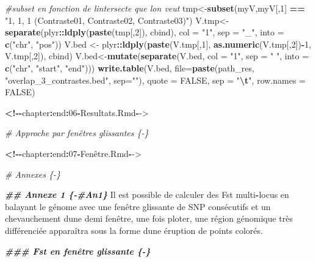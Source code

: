 \documentclass[
  openany]{book}
\newenvironment{Shaded}{\begin{snugshade}}{\end{snugshade}}
\newcommand{\AttributeTok}[1]{\textcolor[rgb]{0.13,0.29,0.53}{#1}}
\newcommand{\CommentTok}[1]{\textcolor[rgb]{0.56,0.35,0.01}{\textit{#1}}}
\newcommand{\ConstantTok}[1]{\textcolor[rgb]{0.56,0.35,0.01}{#1}}
\newcommand{\DecValTok}[1]{\textcolor[rgb]{0.00,0.00,0.81}{#1}}
\newcommand{\DocumentationTok}[1]{\textcolor[rgb]{0.56,0.35,0.01}{\textbf{\textit{#1}}}}
\newcommand{\ErrorTok}[1]{\textcolor[rgb]{0.64,0.00,0.00}{\textbf{#1}}}
\newcommand{\FunctionTok}[1]{\textcolor[rgb]{0.13,0.29,0.53}{\textbf{#1}}}
\newcommand{\NormalTok}[1]{#1}
\newcommand{\OtherTok}[1]{\textcolor[rgb]{0.56,0.35,0.01}{#1}}
\newcommand{\SpecialCharTok}[1]{\textcolor[rgb]{0.81,0.36,0.00}{\textbf{#1}}}
\newcommand{\StringTok}[1]{\textcolor[rgb]{0.31,0.60,0.02}{#1}}
\theoremstyle{definition}
\theoremstyle{definition}
\theoremstyle{definition}
\theoremstyle{definition}
\theoremstyle{remark}
\begin{document}
\begin{Shaded}
\begin{Highlighting}[]
\CommentTok{\#subset en fonction de l\textquotesingle{}intersecte que l\textquotesingle{}on veut}
\NormalTok{tmp}\OtherTok{\textless{}{-}}\FunctionTok{subset}\NormalTok{(myV,myV[,}\DecValTok{1}\NormalTok{] }\SpecialCharTok{==} \StringTok{"1, 1, 1 (Contraste01, Contraste02, Contraste03)"}\NormalTok{)}
\NormalTok{V.tmp}\OtherTok{\textless{}{-}}\FunctionTok{separate}\NormalTok{(plyr}\SpecialCharTok{::}\FunctionTok{ldply}\NormalTok{(}\FunctionTok{paste}\NormalTok{(tmp[,}\DecValTok{2}\NormalTok{]), cbind), }\AttributeTok{col =} \StringTok{"1"}\NormalTok{,  }\AttributeTok{sep =} \StringTok{"\_"}\NormalTok{, }\AttributeTok{into =} \FunctionTok{c}\NormalTok{(}\StringTok{"chr"}\NormalTok{, }\StringTok{"pos"}\NormalTok{))}
\NormalTok{V.bed }\OtherTok{\textless{}{-}}\NormalTok{ plyr}\SpecialCharTok{::}\FunctionTok{ldply}\NormalTok{(}\FunctionTok{paste}\NormalTok{(V.tmp[,}\DecValTok{1}\NormalTok{], }\FunctionTok{as.numeric}\NormalTok{(V.tmp[,}\DecValTok{2}\NormalTok{])}\SpecialCharTok{{-}}\DecValTok{1}\NormalTok{, V.tmp[,}\DecValTok{2}\NormalTok{]), cbind)}
\NormalTok{V.bed}\OtherTok{\textless{}{-}}\FunctionTok{mutate}\NormalTok{(}\FunctionTok{separate}\NormalTok{(V.bed, }\AttributeTok{col =} \StringTok{"1"}\NormalTok{,  }\AttributeTok{sep =} \StringTok{" "}\NormalTok{, }\AttributeTok{into =} \FunctionTok{c}\NormalTok{(}\StringTok{"chr"}\NormalTok{, }\StringTok{"start"}\NormalTok{, }\StringTok{"end"}\NormalTok{)))}
\FunctionTok{write.table}\NormalTok{(V.bed, }\AttributeTok{file=}\FunctionTok{paste}\NormalTok{(path\_res, }\StringTok{"overlap\_3\_contrastes.bed"}\NormalTok{, }\AttributeTok{sep=}\StringTok{""}\NormalTok{), }\AttributeTok{quote =} \ConstantTok{FALSE}\NormalTok{, }\AttributeTok{sep =} \StringTok{"}\SpecialCharTok{\textbackslash{}t}\StringTok{"}\NormalTok{, }\AttributeTok{row.names =} \ConstantTok{FALSE}\NormalTok{)}

\SpecialCharTok{\textless{}!{-}{-}}\NormalTok{chapter}\SpecialCharTok{:}\NormalTok{end}\SpecialCharTok{:}\DecValTok{06}\SpecialCharTok{{-}}\NormalTok{Resultats.Rmd}\SpecialCharTok{{-}}\OtherTok{{-}\textgreater{}}

\CommentTok{\# Approche par fenêtres glissantes \{{-}\}}


\ErrorTok{\textless{}}\SpecialCharTok{!{-}{-}}\NormalTok{chapter}\SpecialCharTok{:}\NormalTok{end}\SpecialCharTok{:}\DecValTok{07}\SpecialCharTok{{-}}\NormalTok{Fenêtre.Rmd}\SpecialCharTok{{-}}\OtherTok{{-}\textgreater{}}

\CommentTok{\# Annexes \{{-}\}}

\DocumentationTok{\#\# Annexe 1 \{{-}\#An1\}}
\NormalTok{Il est possible de calculer des Fst multi}\SpecialCharTok{{-}}\NormalTok{locus en balayant le génome avec une fenêtre glissante de SNP consécutifs et un chevauchement d}\StringTok{\textquotesingle{}une demi fenêtre, une fois ploter, une région génomique très différenciée apparaîtra sous la forme d\textquotesingle{}}\NormalTok{une éruption de points colorés.}

\DocumentationTok{\#\#\# Fst en fenêtre glissante \{{-}\}}
\end{Highlighting}
\end{Shaded}
\end{document}
